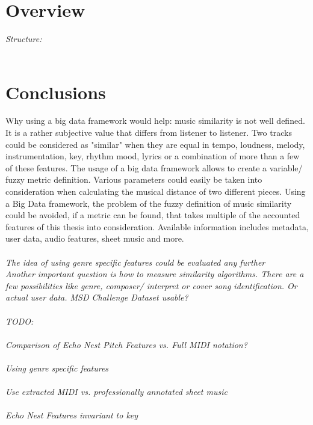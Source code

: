 \section{Overview}

\textit{Structure: \\}
\ \\
\begin{figure}[htbp]
	\centering
\end{figure}

\section{Conclusions}

Why using a big data framework would help: 
music similarity is not well defined. It is a rather subjective value that differs from listener to listener. 
Two tracks could be considered as "similar" when they are equal in tempo, loudness, melody, instrumentation, key, rhythm mood, lyrics or a combination of more than a few of these features. The usage of a big data framework allows to create a variable/ fuzzy metric definition. Various parameters could easily be taken into consideration when calculating the musical distance of two different pieces. 
Using a Big Data framework, the problem of the fuzzy definition of music similarity could be avoided, if a metric can be found, that takes multiple of the accounted features of this thesis into consideration.
Available information includes metadata, user data, audio features, sheet music and more.\\
\textit{\ \\
The idea of using genre specific features could be evaluated any further
\ \\
Another important question is how to measure similarity algorithms. 
There are a few possibilities like genre, composer/ interpret or cover song identification. Or actual user data. MSD Challenge Dataset usable?\cite{msdchallenge1}\\
\ \\
TODO:\\
\ \\
Comparison of Echo Nest Pitch Features vs. Full MIDI notation?\\
\ \\
Using genre specific features\\
\ \\
Use extracted MIDI vs. professionally annotated sheet music\\
\ \\
Echo Nest Features invariant to key\\}


